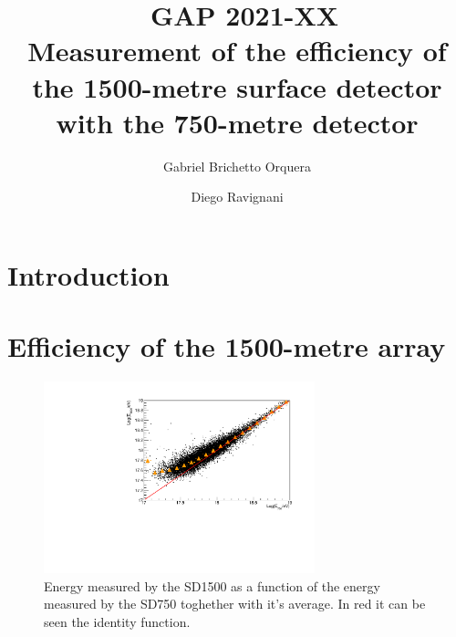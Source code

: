 \documentclass[12pt,a4paper]{article}
\begin{document}

\title{~\hfill {\normalsize \bf GAP 2021-XX} \\
\vspace{1cm} Measurement of the efficiency of the 1500-metre surface detector with the 750-metre detector}

\author[1]{Gabriel Brichetto Orquera}
\author[1]{Diego Ravignani}



\maketitle



\section{Introduction}

\section{Efficiency of the 1500-metre array}
\label{sec:efficiency}

\begin{figure}[h]
\begin{center}
 \includegraphics[width=0.7\textwidth]{plots/energy45.pdf}  
\caption{Energy measured by the SD1500 as a function of the energy measured by the SD750 toghether with it's average. In red it can be seen the identity function.
\label{fig:energy}}
\end{center}
\end{figure} 
\end{document}
